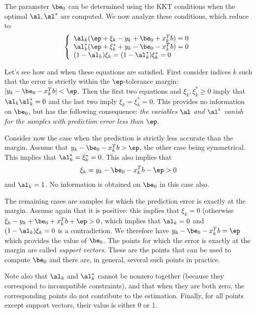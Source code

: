 The parameter $\be_0$ can be determined  using the KKT conditions when the optimal $\al, \al^*$ are computed. We now analyze these conditions, which reduce to
$$
\left\{\begin{array}{l}
\al_k (\ep + \xi_k - y_k + \be_0 + x_k^T b) = 0  \\
\al_k^* (\ep + \xi_k^* + y_k - \be_0 - x_k^T b) = 0  \\
(1-\al_k)\xi_k = (1-\al_k^*)\xi_k^* = 0
       \end{array}
\right.
$$

Let's see how and when these equations are satisfied. First consider indices $k$
such that the error is strictly within the $\ep$-tolerance
margin: $|y_k - \be_0 - x_k^Tb| < \ep$. Then the first two equations and $\xi_k, \xi_k^* \geq 0$ imply that $\al_k  \al_k^* = 0$ and the last two imply $\xi_k  = \xi_k^* = 0$. This provides no information on $\be_0$, but
has the following consequence: {\em the variables $\al$ and $\al^*$
vanish for the samples with prediction error less than $\ep$}. 

Consider now the case when the prediction is strictly less accurate
than the margin. Assume that $y_k - \be_0 - x_k^Tb > \ep$, the other case
being symmetrical. This implies that $\al_k^* = \xi_k^* = 0$. This also implies that 
\[
\xi_k = y_k - \be_0 - x_k^Tb -\ep >0
\]
and $\al_k = 1$. No information is obtained on $\be_0$ in this case also.

The remaining cases are samples for which the prediction error is exactly
at the margin. Assume again that it is positive: this implies that $\xi_k =
0$ (otherwise $\xi_k - y_k + \be_0 + x_k^Tb +\ep > 0$, which implies that $\al_k=0$ and $(1-\al_k)\xi_k=0$ is a contradiction. We therefore have $y_k - \be_0 - x_k^T b = \ep$ which provides the
value of $\be_0$. The points for which the error is exactly at the margin are called {\em support vectors}. These are the points that  can be used to compute 
$\be_0$ and there are, in
general, several such points in practice.

Note also that $\al_k$ and $\al_k^*$ cannot be nonzero together
(because they correspond to incompatible constraints), and that when
they are both zero, the corresponding points do not contribute to the
estimation. Finally, for all points except support vectors, their value is either 0 or 1. 

